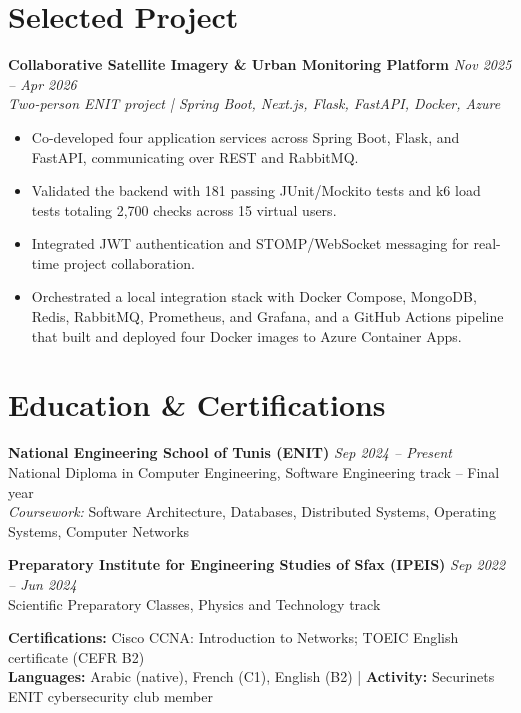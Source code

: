 \documentclass[10pt,a4paper]{article}
\begin{document}
\section{Selected Project}
\textbf{Collaborative Satellite Imagery \& Urban Monitoring Platform} \hfill \textit{Nov 2025 -- Apr 2026}\\
\textit{Two-person ENIT project | Spring Boot, Next.js, Flask, FastAPI, Docker, Azure}
\begin{itemize}
  \item Co-developed four application services across Spring Boot, Flask, and FastAPI, communicating over REST and RabbitMQ.
  \item Validated the backend with 181 passing JUnit/Mockito tests and k6 load tests totaling 2,700 checks across 15 virtual users.
  \item Integrated JWT authentication and STOMP/WebSocket messaging for real-time project collaboration.
  \item Orchestrated a local integration stack with Docker Compose, MongoDB, Redis, RabbitMQ, Prometheus, and Grafana, and a GitHub Actions pipeline that built and deployed four Docker images to Azure Container Apps.
\end{itemize}

\section{Education \& Certifications}
\textbf{National Engineering School of Tunis (ENIT)} \hfill \textit{Sep 2024 -- Present}\\
National Diploma in Computer Engineering, Software Engineering track -- Final year\\
\textit{Coursework:} Software Architecture, Databases, Distributed Systems, Operating Systems, Computer Networks

\textbf{Preparatory Institute for Engineering Studies of Sfax (IPEIS)} \hfill \textit{Sep 2022 -- Jun 2024}\\
Scientific Preparatory Classes, Physics and Technology track

\textbf{Certifications:} Cisco CCNA: Introduction to Networks; TOEIC English certificate (CEFR B2)\\
\textbf{Languages:} Arabic (native), French (C1), English (B2) \enspace|\enspace
\textbf{Activity:} Securinets ENIT cybersecurity club member
\end{document}
